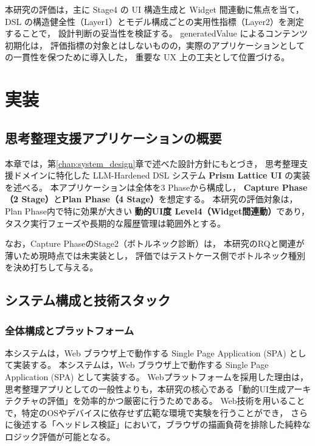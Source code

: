 \documentclass[senior,final,11pt,dvipdfmx]{iputit-thesis}
\begin{document}
本研究の評価は，主に Stage4 の UI 構造生成と Widget 間連動に焦点を当て，
DSL の構造健全性（Layer1）とモデル構成ごとの実用性指標（Layer2）を測定することで，
設計判断の妥当性を検証する。
generatedValue によるコンテンツ初期化は，
評価指標の対象とはしないものの，実際のアプリケーションとしての一貫性を保つために導入した，
重要な UX 上の工夫として位置づける。



\chapter{実装}
\label{chap:implementation}

\section{思考整理支援アプリケーションの概要}

本章では，第\ref{chap:system_design}章で述べた設計方針にもとづき，
思考整理支援ドメインに特化した LLM-Hardened DSL システム \textbf{Prism Lattice UI} の実装を述べる。
本アプリケーションは全体を3 Phaseから構成し，
\textbf{Capture Phase（2 Stage）}と\textbf{Plan Phase（4 Stage）}を想定する。
本研究の評価対象は，Plan Phase内で特に効果が大きい
\textbf{動的UI度 Level4（Widget間連動）}であり，
タスク実行フェーズや長期的な履歴管理は範囲外とする。

なお，Capture PhaseのStage2（ボトルネック診断）は，
本研究のRQと関連が薄いため現時点では未実装とし，
評価ではテストケース側でボトルネック種別を決め打ちして与える。


\section{システム構成と技術スタック}

\subsection{全体構成とプラットフォーム}

本システムは，Web ブラウザ上で動作する Single Page Application (SPA) として実装する。
本システムは，Web ブラウザ上で動作する Single Page Application (SPA) として実装する。
Webプラットフォームを採用した理由は，思考整理アプリとしての一般性よりも，本研究の核心である「動的UI生成アーキテクチャの評価」を効率的かつ厳密に行うためである。
Web技術を用いることで，特定のOSやデバイスに依存せず広範な環境で実験を行うことができ，
さらに後述する「ヘッドレス検証」において，ブラウザの描画負荷を排除した純粋なロジック評価が可能となる。
\end{document}
